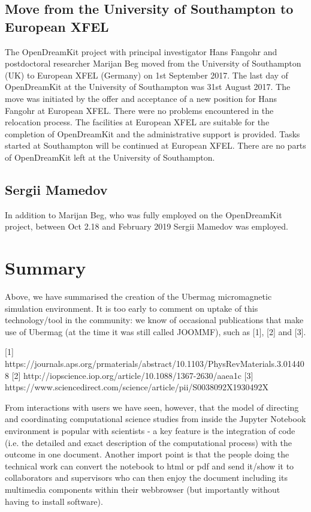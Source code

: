 \documentclass{deliverablereport}
\begin{document}
\subsection{Move from the University of Southampton to European XFEL}

The OpenDreamKit project with principal investigator Hans Fangohr and
postdoctoral researcher Marijan Beg moved from the University of
Southampton (UK) to European XFEL (Germany) on 1st September 2017. The
last day of OpenDreamKit at the University of Southampton was 31st
August 2017. The move was initiated by the offer and acceptance of a
new position for Hans Fangohr at European XFEL. There were no problems
encountered in the relocation process. The facilities at European XFEL
are suitable for the completion of OpenDreamKit and the administrative
support is provided. Tasks started at Southampton will be continued at
European XFEL. There are no parts of OpenDreamKit left at the
University of Southampton.

\subsection{Sergii Mamedov}

In addition to Marijan Beg, who was fully employed on the OpenDreamKit
project, between Oct 2.18 and February 2019 Sergii Mamedov was
employed.

\newpage\printbibliography

\section{Summary}

Above, we have summarised the creation of the Ubermag micromagnetic
simulation environment. It is too early to comment on uptake of this
technology/tool in the community: we know of occasional publications
that make use of Ubermag (at the time it was still called JOOMMF),
such as [1], [2] and [3].

[1] https://journals.aps.org/prmaterials/abstract/10.1103/PhysRevMaterials.3.014408
[2] http://iopscience.iop.org/article/10.1088/1367-2630/aaea1c
[3] https://www.sciencedirect.com/science/article/pii/S0038092X1930492X

From interactions with users we have seen, however, that the model of
directing and coordinating computational science studies from inside
the Jupyter Notebook environment is popular with scientists - a key
feature is the integration of code (i.e. the detailed and exact
description of the computational process) with the outcome in one
document. Another import point is that the people doing the technical
work can convert the notebook to html or pdf and send it/show it to
collaborators and supervisors who can then enjoy the document
including its multimedia components within their webbrowser (but
importantly without having to install software).
\end{document}
